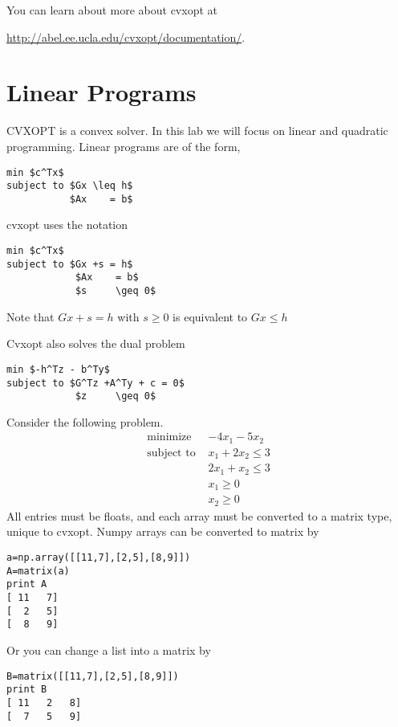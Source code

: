 \label{lab:Optimization 2}

You can learn about more about cvxopt at  

\url{http://abel.ee.ucla.edu/cvxopt/documentation/}.

\section*{Linear Programs}

CVXOPT is a convex solver. In this lab we will focus on linear and quadratic programming.
Linear programs are of the form, 

\begin{lstlisting}[mathescape]
min $c^Tx$
subject to $Gx \leq h$
	       $Ax    = b$
\end{lstlisting}

cvxopt uses the notation

\begin{lstlisting}[mathescape]
min $c^Tx$
subject to $Gx +s = h$
	        $Ax    = b$
	        $s     \geq 0$
\end{lstlisting}

Note that $Gx +s = h$ with $s  \geq 0$ is equivalent to $Gx \leq h$

Cvxopt also solves the dual problem

\begin{lstlisting}[mathescape]
min $-h^Tz - b^Ty$
subject to $G^Tz +A^Ty + c = 0$
	        $z     \geq 0$
\end{lstlisting}

Consider the following problem.
\begin{align*}
\text{minimize } &-4x_1-5x_2 \\
\text{subject to } &x_1+2x_2 \leq 3 \\
	        &2x_1+x_2 \leq 3 \\
		&x_1 \geq 0 \\
		&x_2 \geq 0 
\end{align*}
All entries must be floats, and each array must be converted to a matrix type, unique to cvxopt.
Numpy arrays can be converted to matrix by

\begin{lstlisting}
a=np.array([[11,7],[2,5],[8,9]])
A=matrix(a)
print A
[ 11   7]
[  2   5]
[  8   9]
\end{lstlisting}
Or you can change a list into a matrix by
\begin{lstlisting}
B=matrix([[11,7],[2,5],[8,9]])
print B
[ 11   2   8]
[  7   5   9]
\end{lstlisting}

